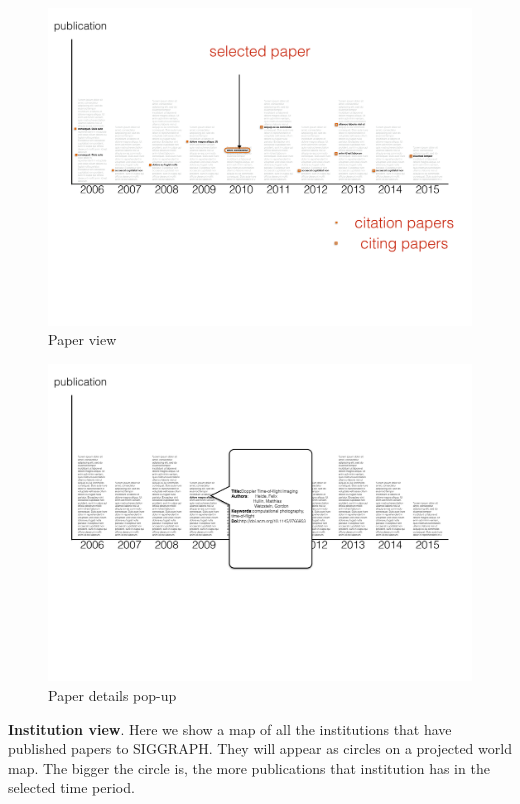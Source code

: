 \documentclass[dvips,12pt]{article}
\begin{document}
\begin{figure}[ht!]
    \centering
    \includegraphics[width=\paperwidth]{visproposalDrawing_page_Part_2.pdf}
    \caption{Paper view}
    \label{fig:paper_view}
\end{figure}

\begin{figure}[ht!]
    \centering
    \includegraphics[width=\paperwidth]{visproposalDrawing_page_Part_8.pdf}
    \caption{Paper details pop-up}
    \label{fig:pop-up}
\end{figure}

\textbf{Institution view}. Here we show a map of all the institutions that have published papers to SIGGRAPH. They will appear as circles on a projected world map. The bigger the circle is, the more publications that institution has in the selected time period.
\end{document}
